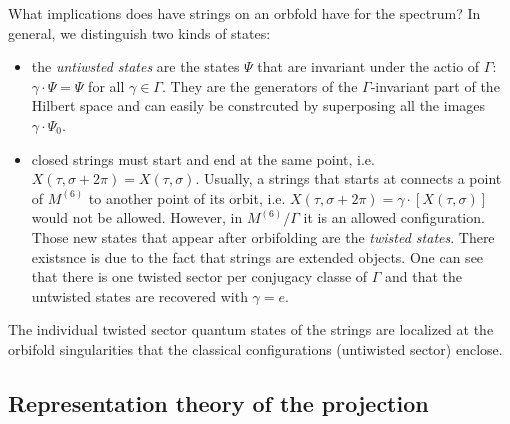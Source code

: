         What implications does have strings on an orbfold have for the spectrum? In general, we distinguish two kinds of states:
        \begin{itemize}
            \item the \emph{untiwsted states} are the states $\Psi$ that are invariant under the actio of $\Gamma$: $\gamma\cdot\Psi=\Psi$ for all $\gamma\in \Gamma$. They are the generators of the $\Gamma$-invariant part of the Hilbert space and can easily be constrcuted by superposing all the images $\gamma\cdot\Psi_0$.
            \item closed strings must start and end at the same point, i.e. $X(\tau,\sigma+2\pi)=X(\tau,\sigma)$. Usually, a strings that starts at connects a point of $M^{(6)}$ to another point of its orbit, i.e. $X(\tau,\sigma+2\pi)=\gamma\cdot[X(\tau,\sigma)]$ would not be allowed. However, in $M^{(6)}/\Gamma$ it is an allowed configuration. Those new states that appear after orbifolding are the \emph{twisted states}. There existsnce is due to the fact that strings are extended objects. One can see that there is one twisted sector per conjugacy classe of $\Gamma$  and that the untwisted states are recovered with $\gamma=e$.
        \end{itemize}
        The individual twisted sector quantum states of the strings are localized at the orbifold singularities that the classical configurations (untiwisted sector) enclose.

    \subsection{Representation theory of the projection}

